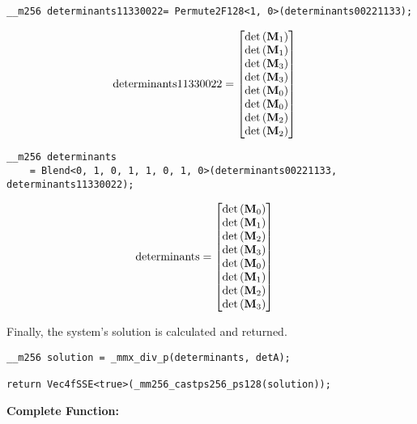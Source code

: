 \begin{verbatim}
__m256 determinants11330022= Permute2F128<1, 0>(determinants00221133);
\end{verbatim} 
\begin{align*}
\mathrm{determinants11330022} 
&=
\begin{bmatrix}
\mathrm{det}\left(\mathbf{M}_1\right)\\
\mathrm{det}\left(\mathbf{M}_1\right)\\
\mathrm{det}\left(\mathbf{M}_3\right)\\
\mathrm{det}\left(\mathbf{M}_3\right)\\
\mathrm{det}\left(\mathbf{M}_0\right)\\
\mathrm{det}\left(\mathbf{M}_0\right)\\
\mathrm{det}\left(\mathbf{M}_2\right)\\
\mathrm{det}\left(\mathbf{M}_2\right)\\
\end{bmatrix}
\end{align*}

\begin{verbatim}
__m256 determinants 
    = Blend<0, 1, 0, 1, 1, 0, 1, 0>(determinants00221133, determinants11330022);
\end{verbatim} 
\begin{align*}
\mathrm{determinants} 
&=
\begin{bmatrix}
\mathrm{det}\left(\mathbf{M}_0\right)\\
\mathrm{det}\left(\mathbf{M}_1\right)\\
\mathrm{det}\left(\mathbf{M}_2\right)\\
\mathrm{det}\left(\mathbf{M}_3\right)\\
\mathrm{det}\left(\mathbf{M}_0\right)\\
\mathrm{det}\left(\mathbf{M}_1\right)\\
\mathrm{det}\left(\mathbf{M}_2\right)\\
\mathrm{det}\left(\mathbf{M}_3\right)\\
\end{bmatrix}
\end{align*}

Finally, the system's solution is calculated and returned.

\begin{verbatim}
__m256 solution = _mmx_div_p(determinants, detA);

return Vec4fSSE<true>(_mm256_castps256_ps128(solution));
\end{verbatim}


\vspace{1cm}
\textbf{Complete Function:}

